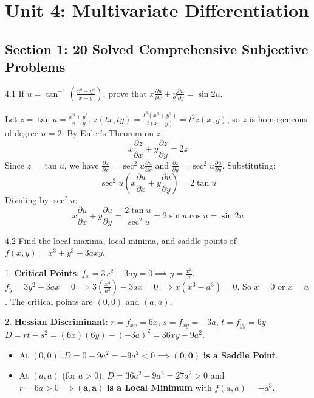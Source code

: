 \chapter{Unit 4: Multivariate Differentiation}

\section{Section 1: 20 Solved Comprehensive Subjective Problems}

\begin{subjectiveq}{4.1}
If $u = \tan^{-1}\left(\frac{x^3 + y^3}{x - y}\right)$, prove that $x \frac{\partial u}{\partial x} + y \frac{\partial u}{\partial y} = \sin 2u$.
\end{subjectiveq}

\begin{solbox}
Let $z = \tan u = \frac{x^3 + y^3}{x - y}$.
$z(tx, ty) = \frac{t^3(x^3+y^3)}{t(x-y)} = t^2 z(x,y)$, so $z$ is homogeneous of degree $n = 2$.
By Euler's Theorem on $z$:
\begin{equation}
x \frac{\partial z}{\partial x} + y \frac{\partial z}{\partial y} = 2 z
\end{equation}
Since $z = \tan u$, we have $\frac{\partial z}{\partial x} = \sec^2 u \frac{\partial u}{\partial x}$ and $\frac{\partial z}{\partial y} = \sec^2 u \frac{\partial u}{\partial y}$.
Substituting:
\begin{equation}
\sec^2 u \left( x \frac{\partial u}{\partial x} + y \frac{\partial u}{\partial y} \right) = 2 \tan u
\end{equation}
Dividing by $\sec^2 u$:
\begin{equation}
x \frac{\partial u}{\partial x} + y \frac{\partial u}{\partial y} = \frac{2\tan u}{\sec^2 u} = 2\sin u \cos u = \sin 2u
\end{equation}
\end{solbox}

\begin{subjectiveq}{4.2}
Find the local maxima, local minima, and saddle points of $f(x,y) = x^3 + y^3 - 3axy$.
\end{subjectiveq}

\begin{solbox}
1. \textbf{Critical Points}:
$f_x = 3x^2 - 3ay = 0 \implies y = \frac{x^2}{a}$.
$f_y = 3y^2 - 3ax = 0 \implies 3\left(\frac{x^4}{a^2}\right) - 3ax = 0 \implies x(x^3 - a^3) = 0$.
So $x = 0$ or $x = a$.
The critical points are $(0, 0)$ and $(a, a)$.

2. \textbf{Hessian Discriminant}:
$r = f_{xx} = 6x$, $s = f_{xy} = -3a$, $t = f_{yy} = 6y$.
$D = rt - s^2 = (6x)(6y) - (-3a)^2 = 36xy - 9a^2$.
\begin{itemize}
    \item At $(0, 0)$: $D = 0 - 9a^2 = -9a^2 < 0 \implies \mathbf{(0,0)}$ \textbf{is a Saddle Point}.
    \item At $(a, a)$ (for $a > 0$): $D = 36a^2 - 9a^2 = 27a^2 > 0$ and $r = 6a > 0 \implies \mathbf{(a,a)}$ \textbf{is a Local Minimum} with $f(a,a) = -a^3$.
\end{itemize}
\end{solbox}

